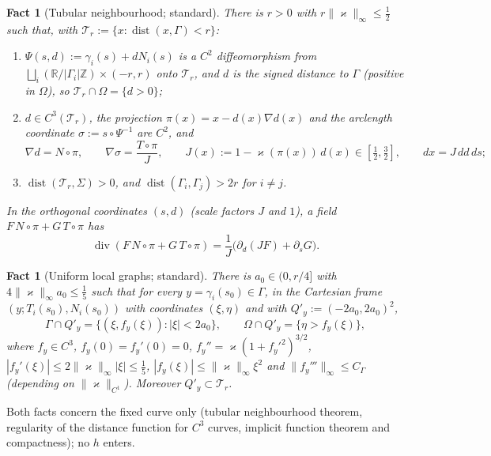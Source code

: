 \documentclass[11pt,reqno]{amsart}
\theoremstyle{plain}
\newtheorem{fact}[theorem]{Fact}
\theoremstyle{definition}
\newcommand{\R}{\mathbb R}
\newcommand{\norm}[1]{\lVert #1\rVert}
\renewcommand{\div}{\operatorname{div}}
\DeclareMathOperator{\dist}{dist}
\newcommand{\kap}{\varkappa}            %
\newcommand{\kapi}{\norm{\kap}_\infty}
\newcommand{\Tr}{\mathcal T_r}
\begin{document}
\begin{fact}[Tubular neighbourhood; standard]\label{gd:fact:tube}
There is $r>0$ with $r\kapi\le\frac12$ such that, with $\Tr:=\{x:\dist(x,\Gamma)<r\}$:
\begin{enumerate}[label=(\roman*)]
\item $\Psi(s,d):=\gamma_i(s)+dN_i(s)$ is a $C^2$ diffeomorphism from $\bigsqcup_i(\R/|\Gamma_i|\mathbb Z)\times(-r,r)$ onto $\Tr$, and $d$ is the signed distance to $\Gamma$ (positive in $\Omega$), so $\Tr\cap\Omega=\{d>0\}$;
\item $d\in C^3(\Tr)$, the projection $\pi(x)=x-d(x)\nabla d(x)$ and the arclength coordinate $\sigma:=s\circ\Psi^{-1}$ are $C^2$, and
\[
\nabla d=N\circ\pi,\qquad \nabla\sigma=\frac{T\circ\pi}{J},\qquad J(x):=1-\kap(\pi(x))\,d(x)\in[\tfrac12,\tfrac32],\qquad dx=J\,dd\,ds;
\]
\item $\dist(\mathcal T_{r},\Sigma)>0$, and $\dist(\Gamma_i,\Gamma_j)>2r$ for $i\ne j$.
\end{enumerate}
In the orthogonal coordinates $(s,d)$ (scale factors $J$ and $1$), a field $F\,N\circ\pi+G\,T\circ\pi$ has
\begin{equation}\label{gd:eq:divnormal}
\div(F\,N\circ\pi+G\,T\circ\pi)=\frac1J\bigl(\partial_d(JF)+\partial_sG\bigr).
\end{equation}
\end{fact}

\begin{fact}[Uniform local graphs; standard]\label{gd:fact:graph}
There is $a_0\in(0,r/4]$ with $4\kapi a_0\le\frac15$ such that for every $y=\gamma_i(s_0)\in\Gamma$, in the Cartesian frame $(y;T_i(s_0),N_i(s_0))$ with coordinates $(\xi,\eta)$ and with $Q'_y:=(-2a_0,2a_0)^2$,
\[
\Gamma\cap Q'_y=\{(\xi,f_y(\xi)):|\xi|<2a_0\},\qquad \Omega\cap Q'_y=\{\eta>f_y(\xi)\},
\]
where $f_y\in C^3$, $f_y(0)=f_y'(0)=0$, $f_y''=\kap(1+f_y'^2)^{3/2}$, $|f_y'(\xi)|\le2\kapi|\xi|\le\frac15$, $|f_y(\xi)|\le\kapi\xi^2$ and $\norm{f_y'''}_\infty\le C_\Gamma$ (depending on $\norm{\kap}_{C^1}$). Moreover $Q'_y\subset\Tr$.
\end{fact}
Both facts concern the fixed curve only (tubular neighbourhood theorem, regularity of the distance function for $C^3$ curves, implicit function theorem and compactness); no $h$ enters.
\end{document}
